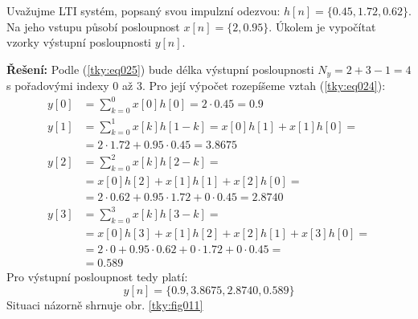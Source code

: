 \begin{mdframed}[style=mdexam]
  \begin{example}\label{tky:exam001}
    Uvažujme LTI systém, popsaný svou impulzní odezvou: \(h[n] = \{0.45, 1.72, 0.62\}\). Na jeho
    vstupu působí posloupnost \(x[n] = \{2,  0.95\}\). Úkolem  je vypočítat vzorky výstupní
    posloupnosti \(y[n]\).

    \textbf{Řešení:} Podle (\ref{tky:eq025}) bude délka výstupní posloupnosti \(N_y = 2 + 3 - 1= 4\)
    s pořadovými indexy 0 až 3. Pro její výpočet rozepíšeme vztah (\ref{tky:eq024}):
    \begin{align*}
      y[0] &= \sum_{k=0}^0 x[0]h[0] = \num{2}\cdot\num{0.45} = \num{0.9}                   \\
      y[1] &= \sum_{k=0}^1 x[k]h[1-k] = x[0]h[1] + x[1]h[0] =                              \\
           &=  \num{2}\cdot\num{1.72} + \num{0.95}\cdot\num{0.45} = \num{3.8675}           \\
      y[2] &= \sum_{k=0}^2 x[k]h[2-k] =                                                    \\
           &= x[0]h[2] + x[1]h[1] + x[2]h[0] =                                             \\
           &= \num{2}\cdot\num{0.62} + \num{0.95}\cdot\num{1.72} + \num{0}\cdot\num{0.45}  
            = \num{2.8740}                                                                 \\
      y[3] &= \sum_{k=0}^3 x[k]h[3-k] =                                                    \\
           &= x[0]h[3] + x[1]h[2] + x[2]h[1] +  x[3]h[0] =                                 \\
           &= \num{2}\cdot\num{0} + \num{0.95}\cdot\num{0.62} + \num{0}\cdot\num{1.72}
            + \num{0}\cdot\num{0.45} =                                                     \\
           &= \num{0.589} 
    \end{align*} 
    Pro výstupní posloupnost tedy platí:
    \begin{equation*}
      y[n] = \{\num{0.9}, \num{3.8675}, \num{2.8740}, \num{0.589}\}
    \end{equation*}
    Situaci názorně shrnuje obr. \ref{tky:fig011}


\end{example}
\end{mdframed}
